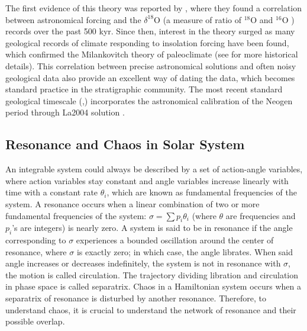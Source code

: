 \documentclass[12pt]{article}
\newcounter{para}[subsection]
\begin{document}
	The first evidence of this theory was reported by \cite{hays1976}, where they found a correlation between astronomical forcing and the $\delta^{18} \text{O}$ (a measure of ratio of $ {}^{18} \text{O} $ and $ {}^{16} \text{O} $  ) records over the past 500 kyr. 
	Since then, interest in the theory surged as many geological records of climate responding to insolation forcing have been found, which confirmed the Milankovitch theory of paleoclimate (see \citealt{imbrie1982} for more historical details). This correlation between precise astronomical solutions and often noisy geological data also provide an excellent way of dating the data, which becomes standard practice in the stratigraphic community. The most recent standard geological timescale (\cite{gradstein2004},\cite{gradstein2012}) incorporates the astronomical calibration of the Neogen period through La2004 solution \citep{laskar2004}. 
	\subsection{Resonance and Chaos in Solar System}
	An integrable system could always be described by a set of action-angle variables, where action variables stay constant and angle variables increase linearly with time with a constant rate $\theta_i$, which are known as fundamental frequencies of the system. 
	A resonance occurs when a linear combination of two or more fundamental frequencies of the system: $\sigma = \sum p_i \theta _i $ (where $\theta$ are frequencies and $p_i$'s are integers) is nearly zero. A system is said to be in resonance if the angle corresponding to $\sigma$ experiences a bounded oscillation around the center of resonance, where $\sigma$ is exactly zero; in which case, the angle librates. When said angle increases or decreases indefinitely, the system is not in resonance with $\sigma$, the motion is called circulation. The trajectory dividing libration and circulation in phase space is called separatrix. Chaos in a Hamiltonian system occurs when a separatrix of resonance is disturbed by another resonance. Therefore, to understand chaos, it is crucial to understand the network of resonance and their possible overlap.  
	
\end{document}
